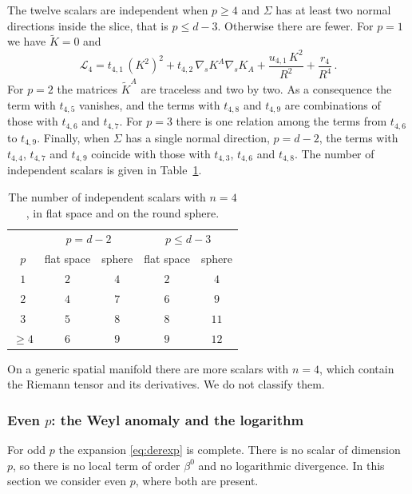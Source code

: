 \documentclass[a4paper,11pt]{article}
\newcommand{\Kt}{\widetilde{K}}
\begin{document}
The twelve scalars are independent when $p\ge4$ and $\Sigma$ has at least two normal directions inside the slice, that is $p\le d-3$. Otherwise there are fewer. For $p=1$ we have $\Kt=0$ and
\begin{equation}\label{eq:L4line}
	\mathcal{L}_4=t_{4,1}\,(K^2)^2+t_{4,2}\,\nabla_sK^A\nabla_sK_A+\frac{u_{4,1}\,K^2}{R^2}+\frac{r_4}{R^4}\, .
\end{equation}
For $p=2$ the matrices $\Kt^A$ are traceless and two by two. As a consequence the term with $t_{4,5}$ vanishes, and the terms with $t_{4,8}$ and $t_{4,9}$ are combinations of those with $t_{4,6}$ and $t_{4,7}$. For $p=3$ there is one relation among the terms from $t_{4,6}$ to $t_{4,9}$. Finally, when $\Sigma$ has a single normal direction, $p=d-2$, the terms with $t_{4,4}$, $t_{4,7}$ and $t_{4,9}$ coincide with those with $t_{4,3}$, $t_{4,6}$ and $t_{4,8}$. The number of independent scalars is given in Table~\ref{tab:L4}. 
\begin{table}[!htb]
	\centering
	\begin{tabular}{ccccc}
		\toprule
		& \multicolumn{2}{c}{$p=d-2$} & \multicolumn{2}{c}{$p\le d-3$}\\
		$p$ & flat space & sphere & flat space & sphere\\
		\midrule
		$1$ & $2$ & $4$ & $2$ & $4$\\
		$2$ & $4$ & $7$ & $6$ & $9$\\
		$3$ & $5$ & $8$ & $8$ & $11$\\
		$\ge4$ & $6$ & $9$ & $9$ & $12$\\
		\bottomrule
	\end{tabular}
	\caption{The number of independent scalars with $n=4$, in flat space and on the round sphere.}
	\label{tab:L4}
\end{table}

On a generic spatial manifold there are more scalars with $n=4$, which contain the Riemann tensor and its derivatives. We do not classify them.


\subsubsection{Even \texorpdfstring{$p$}{p}: the Weyl anomaly and the logarithm}\label{sec:log}

For odd $p$ the expansion \eqref{eq:derexp} is complete. There is no scalar of dimension $p$, so there is no local term of order $\beta^0$ and no logarithmic divergence. In this section we consider even $p$, where both are present.
\end{document}
